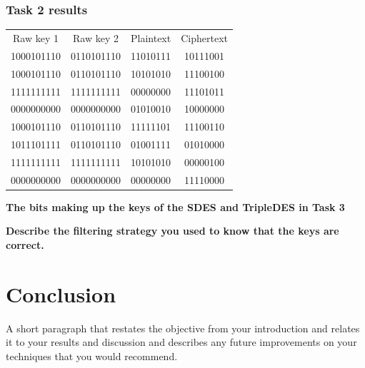 \documentclass[12pt, letterpaper]{article}
\begin{document}
\subsubsection*{Task 2 results}
\begin{center}
\begin{tabular}{ |c|c|c|c| } 
 \hline
 Raw key 1 & Raw key 2 & Plaintext & Ciphertext \\
1000101110 & 0110101110 & 11010111 & 10111001 \\
1000101110 & 0110101110 & 10101010 & 11100100 \\
1111111111 & 1111111111 & 00000000 & 11101011 \\
0000000000 & 0000000000 & 01010010 & 10000000 \\
1000101110 & 0110101110 & 11111101 & 11100110 \\
1011101111 & 0110101110 & 01001111 & 01010000 \\
1111111111 & 1111111111 & 10101010 & 00000100 \\
0000000000 & 0000000000 & 00000000 & 11110000\\
 \hline
\end{tabular}
\end{center}



\textbf{The bits making up the keys of the SDES and TripleDES in Task 3}


\textbf{Describe the filtering strategy you used to know that the keys are correct.}

\section*{Conclusion}
A short paragraph that restates the objective from your introduction and relates it to your results and discussion and describes any future improvements on your techniques that you would recommend. 
\end{document}
